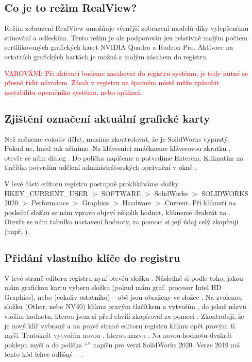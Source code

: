 \subsection*{Co je to režim RealView?}
Režim zobrazení RealView umožňuje věrnější zobrazení modelů díky vylepšenému stínování a odleskům.
Tento režim je ale podporován jen relativně malým počtem certifikovaných grafických karet NVIDIA Quadro a Radeon Pro.
Aktivace na ostatních grafických kartách je možná s malým zásahem do registru.\newline

\noindent\textcolor{red}{VAROVÁNÍ: Při aktivaci budeme zasahovat do registru systému, je tedy nutné se přesně řídit návodem. Zásah v registru na špatném místě může způsobit nestabilitu operačního systému, nebo aplikací.}

\subsection*{Zjištění označení aktuální grafické karty}
Než začneme cokoliv dělat, musíme zkontrolovat, že je SolidWorks vypnutý. 
Pokud ne, hned tak učiníme.
Na klávesnici zmáčkneme klávesovou zkratku , otevře se nám dialog .
Do políčka napíšeme  a potvrdíme Enterem.
Kliknutím na tlačítko  potvrdím udělení administrátorských oprávnění v okně .

V levé části editoru registru postupně proklikáváme složky \newline HKEY\_CURRENT\_USER $>$ SOFTWARE $>$ SolidWorks $>$ SOLIDWORKS 2020 $>$ Performance $>$ Graphics $>$ Hardware $>$ Current.
Při kliknutí na poslední složku se nám vpravo objeví několik hodnot, klikneme dvakrát na .
Otevře se nám tabulka nastavení hodnoty, za pomoci  si její údaj celý zkopíruji (např. ).

\subsection*{Přidání vlastního klíče do registru}
V levé straně editoru registru nyní otevřu složku .
Následně si podle toho, jakou mám grafickou kartu vyberu složku  (pokud mám graf. procesor Intel HD Graphics), nebo  (cokoliv ostatního) -- obě jsou obsaženy ve složce .
Na zvolenou složku (Other, nebo NV40) kliknu pravým tlačítkem a vytvořím , do jehož názvu vložím hodnotu, kterou jsem si před chvílí zkopíroval za pomoci .
Zkontroluji, že je nový klíč vybraný a na pravé straně editoru registru kliknu opět pravým tl. myši.
Tentokrát vytvořím novou , kterou nazvu .
Na novou hodnotu dvakrát poklepu myší a do políčka \enquote{} napíšu  pro verzi SolidWorks 2020.
Verze 2019 má tento kód lehce odlišný -- .

